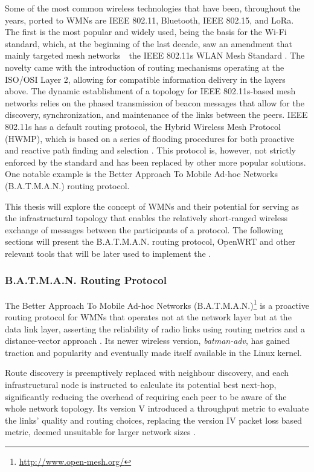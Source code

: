 Some of the most common wireless technologies that have been, throughout the years, ported to WMNs are IEEE 802.11, Bluetooth, IEEE 802.15, and LoRa. The first is the most popular and widely used, being the basis for the Wi-Fi standard, which, at the beginning of the last decade, saw an amendment that mainly targeted mesh networks~\textemdash~the IEEE 802.11s WLAN Mesh Standard \cite{hiertz2010ieee}. The novelty came with the introduction of routing mechanisms operating at the ISO/OSI Layer 2, allowing for compatible information delivery in the layers above. The dynamic establishment of a topology for IEEE 802.11s-based mesh networks relies on the phased transmission of beacon messages that allow for the discovery, synchronization, and maintenance of the links between the peers. IEEE 802.11s has a default routing protocol, the Hybrid Wireless Mesh Protocol (HWMP), which is based on a series of flooding procedures for both proactive and reactive path finding and selection \cite{bari2012performance}. This protocol is, however, not strictly enforced by the standard and has been replaced by other more popular solutions. One notable example is the Better Approach To Mobile Ad-hoc Networks (B.A.T.M.A.N.) routing protocol.

This thesis will explore the concept of WMNs and their potential for serving as the infrastructural topology that enables the relatively short-ranged wireless exchange of messages between the participants of a \pol protocol. The following sections will present the B.A.T.M.A.N. routing protocol, OpenWRT and other relevant tools that will be later used to implement the \poc.

\subsubsection{B.A.T.M.A.N. Routing Protocol}

The Better Approach To Mobile Ad-hoc Networks (B.A.T.M.A.N.)\footnote{\url{http://www.open-mesh.org/}} is a proactive routing protocol for WMNs that operates not at the network layer but at the data link layer, asserting the reliability of radio links using routing metrics and a distance-vector approach \cite{seither2011routing}. Its newer wireless version, \emph{batman-adv}, has gained traction and popularity and eventually made itself available in the Linux kernel.

Route discovery is preemptively replaced with neighbour discovery, and each infrastructural node is instructed to calculate its potential best next-hop, significantly reducing the overhead of requiring each peer to be aware of the whole network topology. Its version V introduced a throughput metric to evaluate the links' quality and routing choices, replacing the version IV packet loss based metric, deemed unsuitable for larger network sizes \cite{seither2011routing}.

